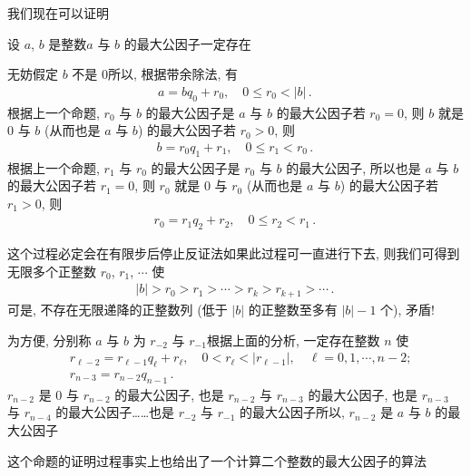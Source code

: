 我们现在可以证明
\begin{proposition}
    设 $a$, $b$ 是整数\period $a$ 与 $b$ 的最大公因子一定存在\period
\end{proposition}

\begin{pf}
    无妨假定 $b$ 不是 $0$\period 所以, 根据带余除法, 有
    \begin{align*}
        a = bq_0 + r_0, \quad 0 \leq r_0 < |b| \period
    \end{align*}
    根据上一个命题, $r_0$ 与 $b$ 的最大公因子是 $a$ 与 $b$ 的最大公因子\period 若 $r_0 = 0$, 则 $b$ 就是 $0$ 与 $b$ (从而也是 $a$ 与 $b$) 的最大公因子\period 若 $r_0 > 0$, 则
    \begin{align*}
        b = r_0 q_1 + r_1, \quad 0 \leq r_1 < r_0 \period
    \end{align*}
    根据上一个命题, $r_1$ 与 $r_0$ 的最大公因子是 $r_0$ 与 $b$ 的最大公因子, 所以也是 $a$ 与 $b$ 的最大公因子\period 若 $r_1 = 0$, 则 $r_0$ 就是 $0$ 与 $r_0$ (从而也是 $a$ 与 $b$) 的最大公因子\period 若 $r_1 > 0$, 则
    \begin{align*}
        r_0 = r_1 q_2 + r_2, \quad 0 \leq r_2 < r_1 \period
    \end{align*}

    这个过程必定会在有限步后停止\period 反证法\period 如果此过程可一直进行下去, 则我们可得到无限多个正整数 $r_0$, $r_1$, $\cdots$ 使
    \begin{align*}
        |b| > r_0 > r_1 > \cdots > r_k > r_{k+1} > \cdots \period
    \end{align*}
    可是, 不存在无限递降的正整数列 (低于 $|b|$ 的正整数至多有 $|b| - 1$ 个), 矛盾!

    为方便, 分别称 $a$ 与 $b$ 为 $r_{-2}$ 与 $r_{-1}$\period 根据上面的分析, 一定存在整数 $n$ 使
    \begin{align*}
         & r_{\ell - 2} = r_{\ell - 1} q_{\ell} + r_{\ell}, \quad 0 < r_{\ell} < |r_{\ell - 1}|, \quad \ell = 0,1,\cdots,n-2; \\
         & r_{n - 3} = r_{n - 2} q_{n - 1} \period
    \end{align*}
    $r_{n-2}$ 是 $0$ 与 $r_{n-2}$ 的最大公因子, 也是 $r_{n-2}$ 与 $r_{n-3}$ 的最大公因子, 也是 $r_{n-3}$ 与 $r_{n-4}$ 的最大公因子……也是 $r_{-2}$ 与 $r_{-1}$ 的最大公因子\period 所以, $r_{n-2}$ 是 $a$ 与 $b$ 的最大公因子\period
\end{pf}

这个命题的证明过程事实上也给出了一个计算二个整数的最大公因子的算法\period

